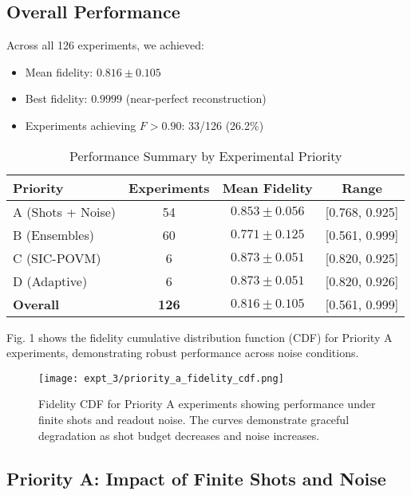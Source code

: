 \documentclass[conference]{IEEEtran}
\begin{document}
\subsection{Overall Performance}

Across all 126 experiments, we achieved:
\begin{itemize}
    \item Mean fidelity: $0.816 \pm 0.105$
    \item Best fidelity: $0.9999$ (near-perfect reconstruction)
    \item Experiments achieving $F > 0.90$: 33/126 (26.2\%)
\end{itemize}

\begin{table}[t]
\centering
\caption{Performance Summary by Experimental Priority}
\label{tab:priority_summary}
\begin{tabular}{lccc}
\toprule
\textbf{Priority} & \textbf{Experiments} & \textbf{Mean Fidelity} & \textbf{Range} \\
\midrule
A (Shots + Noise) & 54 & $0.853 \pm 0.056$ & [0.768, 0.925] \\
B (Ensembles) & 60 & $0.771 \pm 0.125$ & [0.561, 0.999] \\
C (SIC-POVM) & 6 & $0.873 \pm 0.051$ & [0.820, 0.925] \\
D (Adaptive) & 6 & $0.873 \pm 0.051$ & [0.820, 0.926] \\
\midrule
\textbf{Overall} & \textbf{126} & $\mathbf{0.816 \pm 0.105}$ & [0.561, 0.999] \\
\bottomrule
\end{tabular}
\end{table}

Fig. 1 shows the fidelity cumulative distribution function (CDF) for Priority A experiments, demonstrating robust performance across noise conditions.

\begin{figure}[t]
\centering
\texttt{[image: expt\_3/priority\_a\_fidelity\_cdf.png]}
\caption{Fidelity CDF for Priority A experiments showing performance under finite shots and readout noise. The curves demonstrate graceful degradation as shot budget decreases and noise increases.}
\label{fig:priority_a_cdf}
\end{figure}

\subsection{Priority A: Impact of Finite Shots and Noise}
\end{document}
